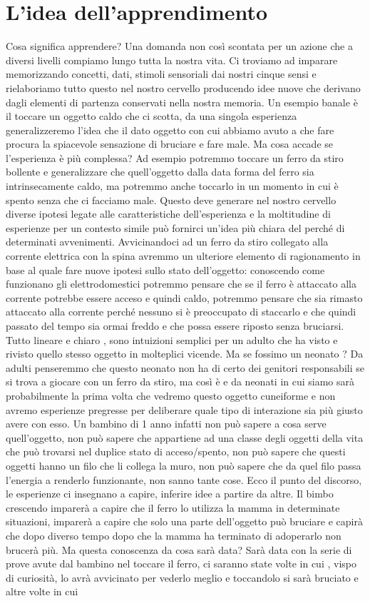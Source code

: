 \section*{L'idea dell'apprendimento}
Cosa significa apprendere? Una domanda non così scontata per un azione che a diversi livelli compiamo lungo tutta la nostra vita. Ci troviamo ad imparare memorizzando concetti, dati, stimoli sensoriali dai nostri cinque sensi e rielaboriamo tutto questo nel nostro cervello producendo idee nuove che derivano dagli elementi di partenza conservati nella nostra memoria. Un esempio banale è il toccare un oggetto caldo che ci scotta, da una singola esperienza generalizzeremo l'idea che il dato oggetto con cui abbiamo avuto a che fare procura la spiacevole sensazione di bruciare e fare male. Ma cosa accade se l'esperienza è più complessa? Ad esempio potremmo toccare un ferro da stiro bollente e generalizzare che quell'oggetto dalla data forma del ferro sia intrinsecamente caldo, ma potremmo anche toccarlo in un momento in cui è spento senza che ci facciamo male. Questo deve generare nel nostro cervello diverse ipotesi legate alle caratteristiche dell'esperienza e la moltitudine di esperienze per un contesto simile può fornirci un'idea più chiara del perché di determinati avvenimenti. Avvicinandoci ad un ferro da stiro collegato alla corrente elettrica con la spina avremmo un ulteriore elemento di ragionamento in base al quale fare nuove ipotesi sullo stato dell'oggetto: conoscendo come funzionano gli elettrodomestici potremmo pensare che se il ferro è attaccato alla corrente potrebbe essere acceso e quindi caldo, potremmo pensare che sia rimasto attaccato alla corrente perché nessuno si è preoccupato di staccarlo e che quindi passato del tempo sia ormai freddo e che possa essere riposto senza bruciarsi. Tutto lineare e chiaro , sono intuizioni semplici per un adulto che ha visto e rivisto quello stesso oggetto in molteplici vicende. Ma se fossimo un neonato ? Da adulti penseremmo che questo neonato non ha di certo dei genitori responsabili se si trova a giocare con un ferro da stiro, ma così è e da neonati in cui siamo sarà probabilmente la prima volta che vedremo questo oggetto cuneiforme e non avremo esperienze pregresse per deliberare quale tipo di interazione sia più giusto avere con esso. Un bambino di 1 anno infatti non può sapere a cosa serve quell'oggetto, non può sapere che appartiene ad una classe degli oggetti della vita che può trovarsi nel duplice stato di acceso/spento, non può sapere che questi oggetti hanno un filo che li collega la muro, non può sapere che da quel filo passa l'energia a renderlo funzionante, non sanno tante cose. Ecco il punto del discorso, le esperienze ci insegnano a capire, inferire idee a partire da altre. Il bimbo crescendo imparerà a capire che il ferro lo utilizza la mamma in determinate situazioni, imparerà a capire che solo una parte dell'oggetto può bruciare e capirà che dopo diverso tempo dopo che la mamma ha terminato di adoperarlo non brucerà più. Ma questa conoscenza da cosa sarà data? Sarà data con la serie di prove avute dal bambino nel toccare il ferro, ci saranno state volte in cui , vispo di curiosità, lo avrà avvicinato per vederlo meglio e toccandolo si sarà bruciato e altre volte in cui 